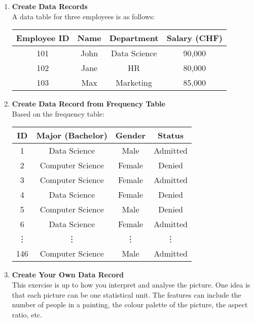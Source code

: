 \documentclass{article}
\begin{document}
\begin{enumerate}
\item
{\bf Create Data Records}\\
A data table for three employees is as follows:

\begin{table}[h!]
    \centering
    \begin{tabular}{|c|c|c|c|}
    \hline
    \textbf{Employee ID} & \textbf{Name} & \textbf{Department} & \textbf{Salary (CHF)} \\
    \hline
    101 & John & Data Science & 90,000 \\
    102 & Jane & HR & 80,000 \\
    103 & Max & Marketing & 85,000 \\
    \hline
    \end{tabular}
\end{table}

\item
{\bf Create Data Record from Frequency Table}\\
Based on the frequency table:

\begin{table}[h!]
    \centering
    \begin{tabular}{|c|c|c|c|}
    \hline
    \textbf{ID} & \textbf{Major (Bachelor)} & \textbf{Gender} & \textbf{Status}\\
    \hline
	1 & Data Science & Male & Admitted\\
	2 & Computer Science & Female & Denied\\
	3 & Computer Science & Female & Admitted\\
	4 & Data Science & Female & Denied\\
	5 & Computer Science & Male & Denied\\
	6 & Data Science & Female & Admitted\\
	\vdots & \vdots & \vdots & \vdots\\
	146 & Computer Science & Male & Admitted\\
    \hline
    \end{tabular}
\end{table}

\item
{\bf Create Your Own Data Record}\\
This exercise is up to how you interpret and analyse the picture. One idea is 
that each picture can be one statistical unit. The features can include the number of 
people in a painting, the colour palette of the picture, the aspect ratio, etc.


\end{enumerate}
\end{document}
